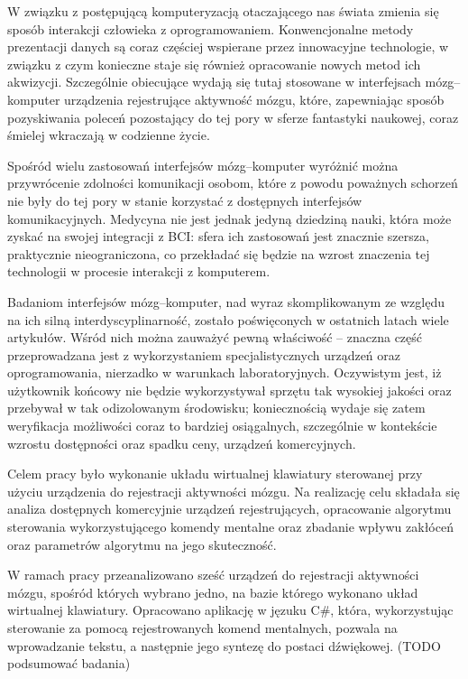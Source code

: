 \documentclass[skorowidz,skroty]{dyplomWEZUT}
\begin{document}
\begin{wprowadzenie}
    W związku z postępującą komputeryzacją otaczającego nas świata zmienia się sposób interakcji człowieka z oprogramowaniem. Konwencjonalne metody prezentacji danych są coraz częściej wspierane przez innowacyjne technologie, w związku z czym konieczne staje się również opracowanie nowych metod ich akwizycji. Szczególnie obiecujące wydają się tutaj stosowane w interfejsach mózg--komputer urządzenia rejestrujące aktywność mózgu, które, zapewniając sposób pozyskiwania poleceń pozostający do tej pory w sferze fantastyki naukowej, coraz śmielej wkraczają w codzienne życie.

    Spośród wielu zastosowań interfejsów mózg--komputer wyróżnić można przywrócenie zdolności komunikacji osobom, które z powodu poważnych schorzeń nie były do tej pory w stanie korzystać z dostępnych interfejsów komunikacyjnych. Medycyna nie jest jednak jedyną dziedziną nauki, która może zyskać na swojej integracji z BCI: sfera ich zastosowań jest znacznie szersza, praktycznie nieograniczona, co przekładać się będzie na wzrost znaczenia tej technologii w procesie interakcji z komputerem.
    
    Badaniom interfejsów mózg--komputer, nad wyraz skomplikowanym ze względu na ich silną interdyscyplinarność, zostało poświęconych w ostatnich latach wiele artykułów. Wśród nich można zauważyć pewną właściwość -- znaczna część przeprowadzana jest z wykorzystaniem specjalistycznych urządzeń oraz oprogramowania, nierzadko w warunkach laboratoryjnych. Oczywistym jest, iż użytkownik końcowy nie będzie wykorzystywał sprzętu tak wysokiej jakości oraz przebywał w tak odizolowanym środowisku; koniecznością wydaje się zatem weryfikacja możliwości coraz to bardziej osiągalnych, szczególnie w kontekście wzrostu dostępności oraz spadku ceny, urządzeń komercyjnych.
\end{wprowadzenie}

\cel
{
Celem pracy było wykonanie układu wirtualnej klawiatury sterowanej przy użyciu urządzenia do rejestracji aktywności mózgu. Na realizację celu składała się analiza dostępnych komercyjnie urządzeń rejestrujących, opracowanie algorytmu sterowania wykorzystującego komendy mentalne oraz zbadanie wpływu zakłóceń oraz parametrów algorytmu na jego skuteczność. 
}

\zakres
{
W ramach pracy przeanalizowano sześć urządzeń do rejestracji aktywności mózgu, spośród których wybrano jedno, na bazie którego wykonano układ wirtualnej klawiatury. Opracowano aplikację w jęzuku C\#, która, wykorzystując sterowanie za pomocą rejestrowanych komend mentalnych, pozwala na wprowadzanie tekstu, a następnie jego syntezę do postaci dźwiękowej.
(TODO podsumować badania)
}
\end{document}
